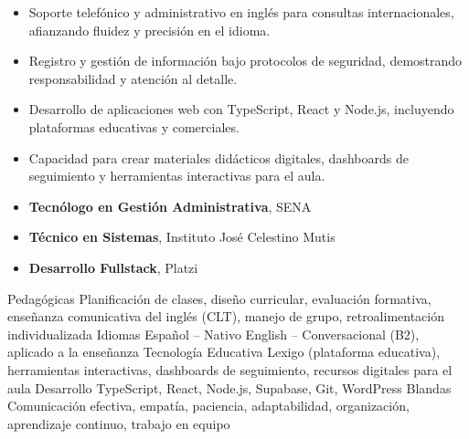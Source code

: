 \documentclass[11pt, a4paper]{awesome-cv}
\begin{document}
\begin{itemize}
  \item Soporte telefónico y administrativo en inglés para consultas internacionales, afianzando fluidez y precisión en el idioma.
  \item Registro y gestión de información bajo protocolos de seguridad, demostrando responsabilidad y atención al detalle.
\end{itemize}

\begin{itemize}
  \item Desarrollo de aplicaciones web con TypeScript, React y Node.js, incluyendo plataformas educativas y comerciales.
  \item Capacidad para crear materiales didácticos digitales, dashboards de seguimiento y herramientas interactivas para el aula.
\end{itemize}


\begin{itemize}
  \item \textbf{Tecnólogo en Gestión Administrativa}, SENA
  \item \textbf{Técnico en Sistemas}, Instituto José Celestino Mutis
  \item \textbf{Desarrollo Fullstack}, Platzi
\end{itemize}


\begin{cvskills}
  \cvskill
    {Pedagógicas}
    {Planificación de clases, diseño curricular, evaluación formativa, enseñanza comunicativa del inglés (CLT), manejo de grupo, retroalimentación individualizada}
  \cvskill
    {Idiomas}
    {Español -- Nativo \quad English -- Conversacional (B2), aplicado a la enseñanza}
  \cvskill
    {Tecnología Educativa}
    {Lexigo (plataforma educativa), herramientas interactivas, dashboards de seguimiento, recursos digitales para el aula}
  \cvskill
    {Desarrollo}
    {TypeScript, React, Node.js, Supabase, Git, WordPress}
  \cvskill
    {Blandas}
    {Comunicación efectiva, empatía, paciencia, adaptabilidad, organización, aprendizaje continuo, trabajo en equipo}
\end{cvskills}

\end{document}
